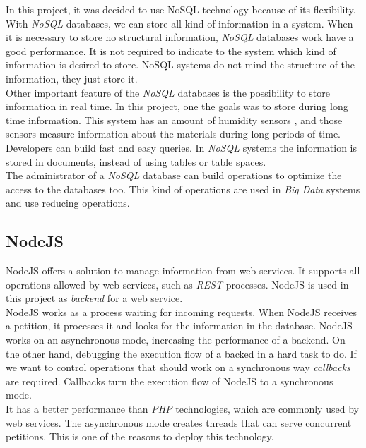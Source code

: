 In this project, it was decided to use NoSQL technology because of its flexibility. With \textit{NoSQL} databases, we can store all kind of information in a system. When it is necessary to store no structural information, \textit{NoSQL} databases work have a good performance. It is not required to indicate to the system which kind of information is desired to store. NoSQL systems do not mind the structure of the information, they just store it.\\

Other important feature of the \textit{NoSQL} databases is the possibility to store information in real time. In this project, one the goals was to store during long time information. This system has an amount of humidity sensors \cite{humidity_system}, and those sensors measure information about the materials during long periods of time.\\

Developers can build fast and easy queries. In \textit{NoSQL} systems the information is stored in documents, instead of using tables or table spaces.\\

The administrator of a \textit{NoSQL} database can build operations to optimize the access to the databases too. This kind of operations are used in \textit{Big Data} systems and use reducing operations.

\subsection{NodeJS}

NodeJS \cite{node_js, node_js_introduction} offers a solution to manage information from web services. It supports all operations allowed by web services, such as \textit{REST} processes. NodeJS is used in this project as \textit{backend} for a web service.\\

NodeJS works as a process waiting for incoming requests. When NodeJS receives a petition, it processes it and looks for the information in the database. NodeJS works on an asynchronous mode, increasing the performance of a backend. On the other hand, debugging the execution flow of a backed in a hard task to do. If we want to control operations that should work on a synchronous way \textit{callbacks} are required. Callbacks turn the execution flow of NodeJS to a synchronous mode.\\

It has a better performance than \textit{PHP} technologies, which are commonly used by web services. The asynchronous mode creates threads that can serve concurrent petitions. This is one of the reasons to deploy this technology.\\


